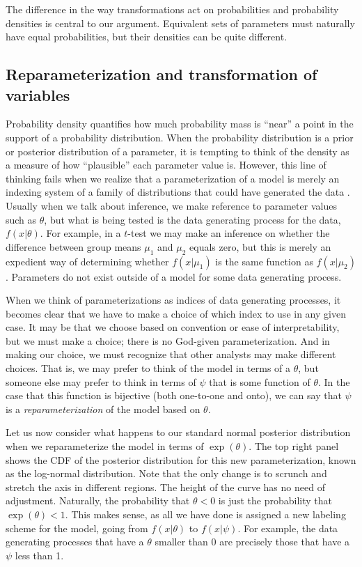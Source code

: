 \documentclass[9pt,twocolumn,twoside]{cidlab-draft}\templatetype{cidlab-invited}
\begin{document}
The difference in the way transformations act on probabilities and probability densities is central to our argument. Equivalent sets of parameters must naturally have equal probabilities, but their densities can be quite different.

\subsection*{Reparameterization and transformation of variables}
Probability density quantifies how much probability mass is ``near'' a point in the support of a probability distribution. When the probability distribution is a prior or posterior distribution of a parameter, it is tempting to think of the density as a measure of how ``plausible'' each parameter value is. However, this line of thinking fails when we realize that a parameterization of a model is merely an indexing system of a family of distributions that could have generated the data \cite{bernardo2005}. Usually when we talk about inference, we make reference to parameter values such as $\theta$, but what is being tested is the data generating process for the data, $f(x|\theta)$. For example, in a $t$-test we may make an inference on whether the difference between group means $\mu_1$ and $\mu_2$ equals zero, but this is merely an expedient way of determining whether $f(x|\mu_1)$ is the same function as $f(x|\mu_2)$. Parameters do not exist outside of a model for some data generating process. 

When we think of parameterizations as indices of data generating processes, it becomes clear that we have to make a choice of which index to use in any given case. It may be that we choose based on convention or ease of interpretability, but we must make a choice; there is no God-given parameterization. And in making our choice, we must recognize that other analysts may make different choices. That is, we may prefer to think of the model in terms of a $\theta$, but someone else may prefer to think in terms of $\psi$ that is some function of $\theta$. In the case that this function is bijective (both one-to-one and onto), we can say that $\psi$ is a \textit{reparameterization} of the model based on $\theta$. 

Let us now consider what happens to our standard normal posterior distribution when we reparameterize the model in terms of $\exp{(\theta)}$. The top right panel shows the CDF of the posterior distribution for this new parameterization, known as the log-normal distribution. Note that the only change is to scrunch and stretch the axis in different regions.  The height of the curve has no need of adjustment. Naturally, the probability that $\theta<0$ is just the probability that $\exp{(\theta)}<1$. This makes sense, as all we have done is assigned a new labeling scheme for the model, going from $f(x|\theta)$ to $f(x|\psi)$.  For example, the data generating processes that have a $\theta$ smaller than 0 are precisely those that have a $\psi$ less than 1. 
 
\end{document}
